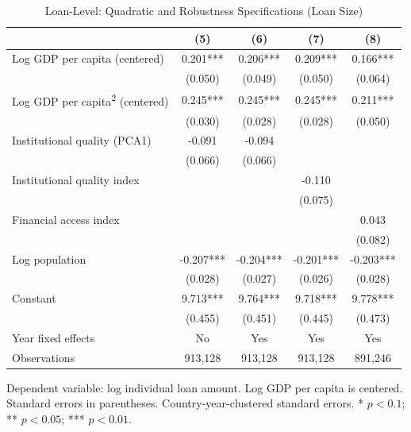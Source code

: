 \begin{table}[htbp]
\centering
\caption{Loan-Level: Quadratic and Robustness Specifications (Loan Size)}
\label{tab:table6}
\begin{tabular}{lcccc}
\toprule
 & (5) & (6) & (7) & (8) \\
\midrule
Log GDP per capita (centered) & 0.201*** & 0.206*** & 0.209*** & 0.166*** \\
 & (0.050) & (0.049) & (0.050) & (0.064) \\
Log GDP per capita\textsuperscript{2} (centered) & 0.245*** & 0.245*** & 0.245*** & 0.211*** \\
 & (0.030) & (0.028) & (0.028) & (0.050) \\
Institutional quality (PCA1) & -0.091 & -0.094 &  &  \\
 & (0.066) & (0.066) &  &  \\
Institutional quality index &  &  & -0.110 &  \\
 &  &  & (0.075) &  \\
Financial access index &  &  &  & 0.043 \\
 &  &  &  & (0.082) \\
Log population & -0.207*** & -0.204*** & -0.201*** & -0.203*** \\
 & (0.028) & (0.027) & (0.026) & (0.028) \\
Constant & 9.713*** & 9.764*** & 9.718*** & 9.778*** \\
 & (0.455) & (0.451) & (0.445) & (0.473) \\
\midrule
Year fixed effects & No & Yes & Yes & Yes \\
Observations & 913,128 & 913,128 & 913,128 & 891,246 \\
\bottomrule
\end{tabular}
\par\smallskip\footnotesize Dependent variable: log individual loan amount. Log GDP per capita is centered. Standard errors in parentheses. Country-year-clustered standard errors. * $p<0.1$; ** $p<0.05$; *** $p<0.01$.
\end{table}